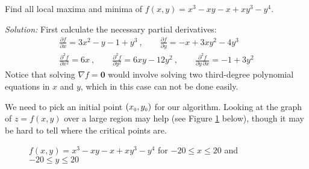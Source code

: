 \begin{exmp}
 Find all local maxima and minima of $f(x,y) = x^3 - xy - x + xy^3 - y^4$.\vspace{1mm}
 \par\noindent\emph{Solution:} First calculate the necessary partial derivatives:
 \begin{gather*}
  \frac{\partial f}{\partial x} = 3x^2 - y - 1 + y^3 ~, \qquad
  \frac{\partial f}{\partial y} = -x + 3xy^2 - 4y^3\\[6pt]
  \frac{\partial^2 f}{\partial x^2} = 6x ~, \qquad
  \frac{\partial^2 f}{\partial y^2} = 6xy - 12y^2 ~, \qquad
  \frac{\partial^2 f}{\partial y \, \partial x} = -1 + 3y^2
 \end{gather*}
 Notice that solving $\nabla f = \textbf{0}$ would involve solving two third-degree polynomial equations in $x$ and
 $y$, which in this case can not be done easily.
 
 We need to pick an initial point $(x_{\scriptscriptstyle 0},y_{\scriptscriptstyle 0})$ for our algorithm. Looking at the graph of
 $z = f(x,y)$ over a large region may help (see Figure \ref{fig:newtonbig} below), though it may be hard to tell
 where the critical points are.\vspace{-8mm}
\begin{figure}[h]
 \begin{center}
  
 \end{center}\vspace{-9mm}
 \caption[]{\quad $f(x,y) = x^3 - xy - x + xy^3 - y^4$ for $-20 \le x \le 20$ and $-20 \le y \le 20$}
 \label{fig:newtonbig}
\end{figure}


\end{exmp}
